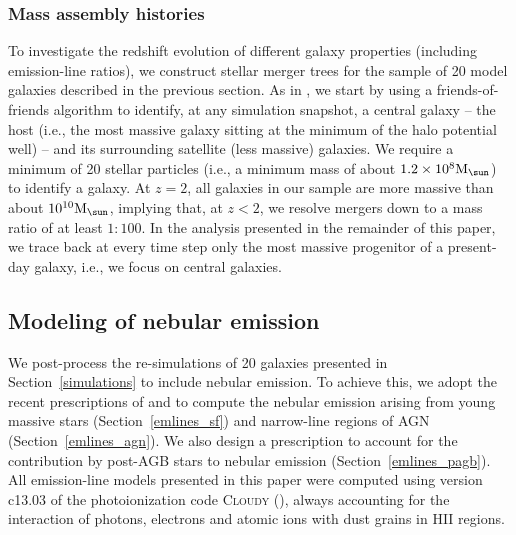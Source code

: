 \documentclass[fleqn,usenatbib]{mnras}
\newcommand{\Msun}{\hbox{M$_\sun$}}
\begin{document}
\subsubsection{Mass assembly histories}

To investigate the redshift evolution of different galaxy properties 
(including emission-line ratios), we construct stellar merger trees
for  the sample of 20 model galaxies described in the previous
section. As in  \citet{Oser12}, we start by using a friends-of-friends
algorithm to identify, at  any simulation snapshot, a central galaxy
-- the host (i.e., the most massive  galaxy sitting at the minimum of
the halo potential well) -- and its surrounding  satellite (less
massive) galaxies. We require a minimum of 20 stellar particles
(i.e., a minimum mass of about $1.2 \times 10^8 \Msun$) to identify a
galaxy.  At $z = 2$, all galaxies in our sample are more massive than
about $10^{10}\Msun$, implying that, at $z<2$, we resolve mergers down
to a mass ratio of at least $1:100$. In the analysis presented in the
remainder of this paper, we trace back at every time step only the
most massive progenitor of a present-day galaxy, i.e., we focus on
central galaxies. 



\subsection{Modeling of nebular emission}\label{nelms} 

We post-process the re-simulations of 20 galaxies presented in
Section~\ref{simulations} to include nebular emission. To achieve
this, we adopt the recent prescriptions of \citet{Gutkin16} and
\citet{Feltre16} to compute the nebular emission arising from young
massive stars  (Section~\ref{emlines_sf}) and narrow-line regions of
AGN (Section~\ref{emlines_agn}). We also design a prescription to
account for the contribution by post-AGB stars to nebular  emission
(Section~\ref{emlines_pagb}). All emission-line models  presented in
this paper  were computed using version c13.03 of the photoionization
code \textsc{Cloudy} (\citealp{Ferland13}), always accounting
for  the interaction of photons, electrons and atomic ions with dust
  grains in HII regions. 
\end{document}
